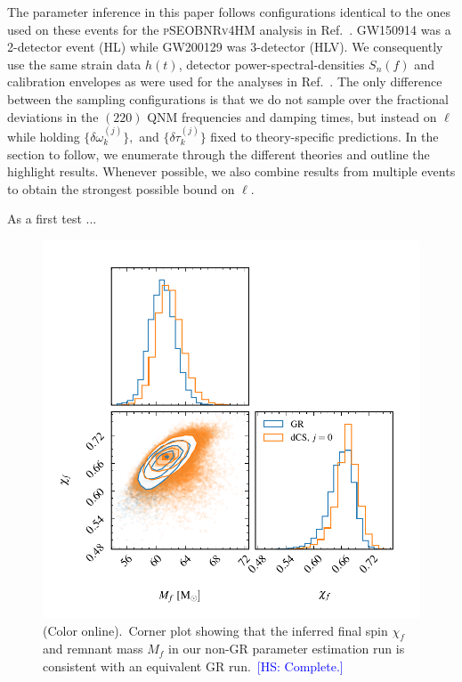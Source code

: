 \documentclass[twocolumn,prd,aps,superscriptaddress,preprintnumbers,tightenlines,showpacs,nofootinbib,amsfonts,amsmath,longbibliography]{revtex4-1}
\newcommand{\hs}[1]{{\textcolor{blue}{{[HS: #1]}} }}
\begin{document}
The parameter inference in this paper follows configurations identical to the
ones used on these events for the \textsc{pSEOBNRv4HM} analysis in
Ref.~\cite{LIGOScientific:2021sio}. GW150914 was a 2-detector event (HL) while
GW200129 was 3-detector (HLV).
%
We consequently use the same strain data $h(t)$, detector
power-spectral-densities $S_n(f)$ and calibration envelopes as were used for
the analyses in Ref.~\cite{LIGOScientific:2021sio}.
%
The only difference between the sampling configurations is that we do not
sample over the fractional deviations in the $(220)$ QNM frequencies and
damping times, but instead on $\ell$ while holding $\{\delta \omega_k^{(j)}\},$
and $\{\delta \tau_k^{(j)}\}$ fixed to theory-specific predictions.
%
In the section to follow, we enumerate through the different theories and
outline the highlight results. Whenever possible, we also combine results from
multiple events to obtain the strongest possible bound on $\ell$.


As a first test ...

\begin{figure}[t]
\includegraphics[width=\columnwidth]{figs/tmp_corner_plot.pdf}
\caption{(Color online).~Corner plot showing that the inferred final spin $\chi_f$ and remnant mass $M_f$
in our non-GR parameter estimation run is consistent with an equivalent GR run.~\hs{Complete.}}
\label{fig:corner_plot}
\end{figure}
\end{document}
